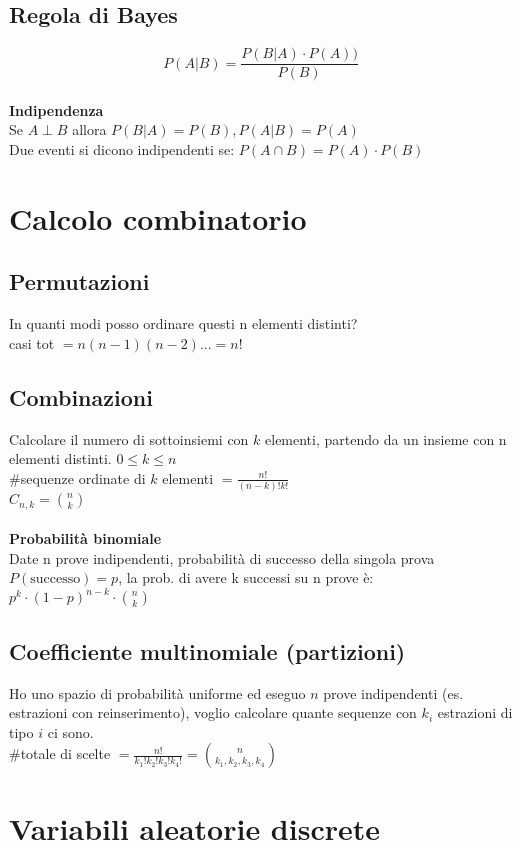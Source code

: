 \documentclass{article}
\begin{document}
\begin{multicols*}{3}
		\subsection{Regola di Bayes}
		\[P(A|B)= \frac{P(B|A)\cdot P(A))}{P(B)}\]\\
		\textbf{Indipendenza}\\
		Se \(A \perp B\) allora \(P(B|A) = P(B) , P(A|B)= P(A)\)\\
		Due eventi si dicono indipendenti se: \(P(A\cap B)= P(A)\cdot P(B)\)
		\section{Calcolo combinatorio}
		\subsection{Permutazioni}
		In quanti modi posso ordinare questi n elementi distinti?\\
		casi tot \(=  n(n-1)(n-2)...=n!\)
		\subsection{Combinazioni}
		Calcolare il numero di sottoinsiemi con \(k\) elementi, partendo da un insieme con n elementi distinti. \(0\leq k \leq n\)\\
		\#sequenze ordinate di \(k\) elementi \(= \frac{n!}{(n-k)!k!}\)\\
		\(C_{n,k}= \binom{n}{k}\)\\\\
		\textbf{Probabilità binomiale}\\
		Date n prove indipendenti, probabilità di successo della singola prova \(P(\text{successo})= p\), la prob. di avere k successi su n prove è: \(p^k \cdot (1-p)^{n-k} \cdot \binom{n}{k}\)
		\subsection{Coefficiente multinomiale (partizioni)}
		Ho uno spazio di probabilità uniforme ed eseguo \(n\) prove indipendenti (es. estrazioni con reinserimento), voglio calcolare quante sequenze con \(k_i\) estrazioni di tipo \(i\) ci sono.\\
		\#totale di scelte \(= \frac{n!}{k_1!k_2!k_3!k_4!} = \binom{n}{k_1,k_2,k_3,k_4}\)
		
		\section{Variabili aleatorie discrete}

\end{multicols*}
\end{document}
